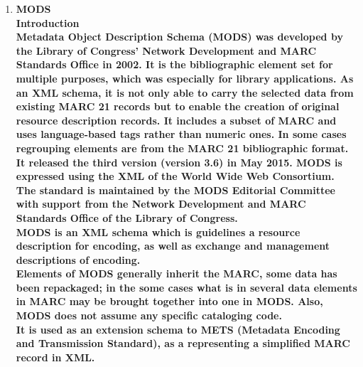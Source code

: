 \begin{enumerate}
	
	\item \bf MODS\\
	{\bf Introduction}\\
	Metadata Object Description Schema (MODS) was developed by the Library of Congress' Network Development and MARC Standards Office in 2002. 
	It is the bibliographic element set for multiple purposes, which was especially for library applications. 
	As an XML schema, it is not only able to carry the selected data from existing MARC 21 records but to enable the creation of original resource description records. 
	It includes a subset of MARC and uses language-based tags rather than numeric ones. In some cases regrouping elements are from the MARC 21 bibliographic format. 
	It released the third version (version 3.6) in May 2015. MODS is expressed using the XML of the World Wide Web Consortium. 
	The standard is maintained by the MODS Editorial Committee with support from the Network Development and MARC Standards Office of the Library of Congress.\\
	
	MODS is an XML schema which is guidelines a resource description for encoding, as well as exchange and management descriptions of encoding.\\
	
	Elements of MODS generally inherit the MARC, some data has been repackaged; in the some cases what is in several data elements in MARC may be brought together into one in MODS. Also, MODS does not assume any specific cataloging code.\\ 
	It is used as an extension schema to METS (Metadata Encoding and Transmission Standard), as a representing a simplified MARC record in XML.
	

\end{enumerate}
